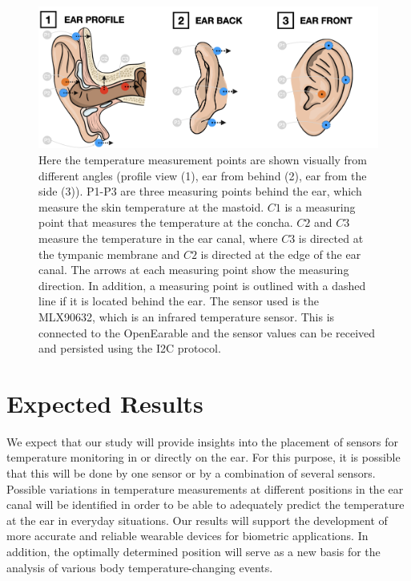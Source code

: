 \begin{figure}
    \centering
    \includegraphics[scale=0.26]{thesis-doc/images/ear_measurement_points/emp.png}
    \caption{Here the temperature measurement points are shown visually from different angles (profile view (1), ear from behind (2), ear from the side (3)). P1-P3 are three measuring points behind the ear, which measure the skin temperature at the mastoid. $C1$ is a measuring point that measures the temperature at the concha. $C2$ and $C3$ measure the temperature in the ear canal, where $C3$ is directed at the tympanic membrane and $C2$ is directed at the edge of the ear canal. The arrows at each measuring point show the measuring direction. In addition, a measuring point is outlined with a dashed line if it is located behind the ear. The sensor used is the MLX90632, which is an infrared temperature sensor. This is connected to the OpenEarable and the sensor values can be received and persisted using the I2C protocol.}
    \label{fig:ear_measurement_positions}
\end{figure}

\section{Expected Results}
\label{ch:Introduction:ExpectedResults}
We expect that our study will provide insights into the placement of sensors for temperature monitoring in or directly on the ear.
For this purpose, it is possible that this will be done by one sensor or by a combination of several sensors.
Possible variations in temperature measurements at different positions in the ear canal will be identified in order to be able to adequately predict the temperature at the ear in everyday situations.
Our results will support the development of more accurate and reliable wearable devices for biometric applications. 
In addition, the optimally determined position will serve as a new basis for the analysis of various body temperature-changing events.